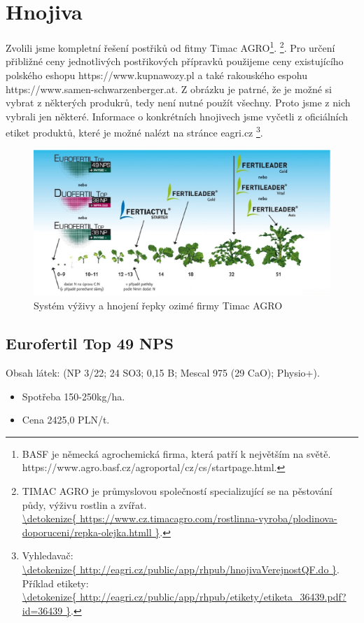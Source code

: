 
\section{Hnojiva}
Zvolili jsme kompletní řešení postřiků od fitmy Timac AGRO\footnote{BASF je německá agrochemická firma, která patří k 
největším na světě.\\https://www.agro.basf.cz/agroportal/cz/cs/startpage.html.}.
\footnote{TIMAC AGRO je průmyslovou společností specializující se na pěstování půdy, výživu rostlin a zvířat.\\\url{\detokenize{
https://www.cz.timacagro.com/rostlinna-vyroba/plodinova-doporuceni/repka-olejka.htmll
}}.}.
Pro určení přibližné ceny jednotlivých postřikových přípravků použijeme ceny existujícího polského eshopu https://www.kupnawozy.pl a také
rakouského espohu https://www.samen-schwarzenberger.at. Z obrázku je patrné, že je možné si vybrat z některých produkrů, tedy není nutné použít všechny.
Proto jsme z nich vybrali jen některé. Informace o konkrétních hnojivech jsme vyčetli z oficiálních etiket produktů,
 které je možné nalézt na stránce eagri.cz
\footnote{Vyhledavač:\\\url{\detokenize{
http://eagri.cz/public/app/rhpub/hnojivaVerejnostQF.do
}}. Příklad etikety:\\\url{\detokenize{
http://eagri.cz/public/app/rhpub/etikety/etiketa_36439.pdf?id=36439
}}.}.
\begin{figure}[ht!]
\centering
\includegraphics[width=170mm]{img/timac_hnojiva.eps}
\caption{Systém výživy a hnojení řepky ozimé firmy Timac AGRO \label{timac_hnojiva}}
\end{figure}

\subsection{Eurofertil Top 49 NPS}
Obsah látek: (NP 3/22; 24 SO3; 0,15 B; Mescal 975 (29 CaO); Physio+).
\begin{itemize}
  \item Spotřeba 150-250kg/ha.
  \item Cena 2425,0 PLN/t.
\end{itemize}

